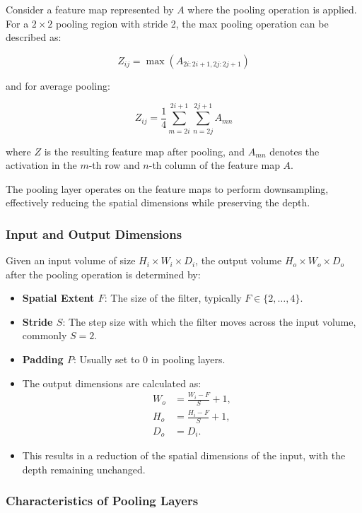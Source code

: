 Consider a feature map represented by \( A \) where the pooling operation is applied. For a \( 2 \times 2 \) pooling region with stride 2, the max pooling operation can be described as:

\[
Z_{ij} = \max(A_{2i:2i+1, 2j:2j+1})
\]

and for average pooling:

\[
Z_{ij} = \frac{1}{4} \sum_{m=2i}^{2i+1} \sum_{n=2j}^{2j+1} A_{mn}
\]

where \( Z \) is the resulting feature map after pooling, and \( A_{mn} \) denotes the activation in the \( m \)-th row and \( n \)-th column of the feature map \( A \).



The pooling layer operates on the feature maps to perform downsampling, effectively reducing the spatial dimensions while preserving the depth.

\subsubsection{Input and Output Dimensions}

Given an input volume of size \( H_i \times W_i \times D_i \), the output volume \( H_o \times W_o \times D_o \) after the pooling operation is determined by:

\begin{itemize}
    \item \textbf{Spatial Extent \( F \)}: The size of the filter, typically \( F \in \{2, \ldots, 4\} \).
    \item \textbf{Stride \( S \)}: The step size with which the filter moves across the input volume, commonly \( S = 2 \).
    \item \textbf{Padding \( P \)}: Usually set to 0 in pooling layers.
    \item The output dimensions are calculated as:
    \begin{align*}
        W_o &= \frac{W_i - F}{S} + 1, \\
        H_o &= \frac{H_i - F}{S} + 1, \\
        D_o &= D_i.
    \end{align*}
    \item This results in a reduction of the spatial dimensions of the input, with the depth remaining unchanged.
\end{itemize}

\subsubsection{Characteristics of Pooling Layers}


